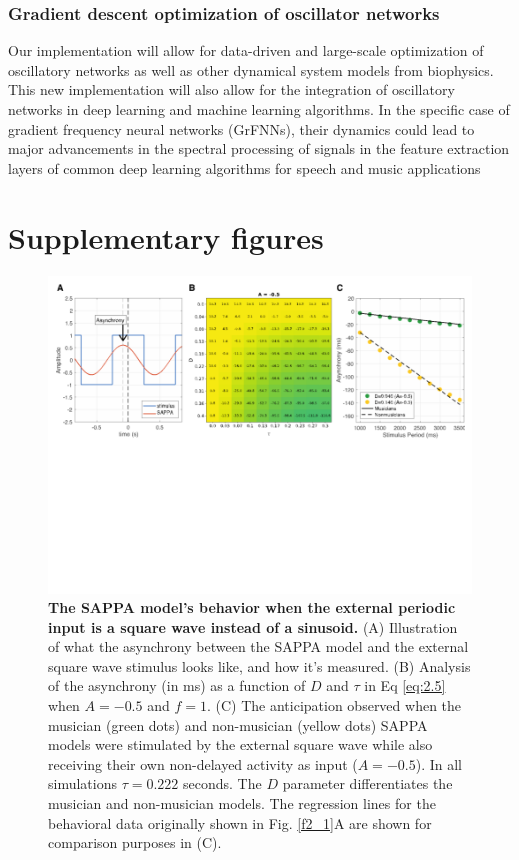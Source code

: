\documentclass{report}
\begin{document}
\subsection{Gradient descent optimization of oscillator networks}
Our implementation will allow for data-driven and large-scale optimization of oscillatory networks as well as other dynamical system models from biophysics. This new implementation will also allow for the integration of oscillatory networks in deep learning and machine learning algorithms. In the specific case of gradient frequency neural networks (GrFNNs), their dynamics could lead to major advancements in the spectral processing of signals in the feature extraction layers of common deep learning algorithms for speech and music applications


\appendix
\chapter{Supplementary figures}
\begin{figure}
    \centering
    \includegraphics[width=1.0\textwidth]{figures/figS_1.png}
    \caption[The SAPPA model's behavior when the external periodic input is a square wave instead of a sinusoid]{\textbf{The SAPPA model's behavior when the external periodic input is a square wave instead of a sinusoid.} (A) Illustration of what the asynchrony between the SAPPA model and the external square wave stimulus looks like, and how it's measured. (B) Analysis of the asynchrony (in ms) as a function of $D$ and $\tau$ in Eq \eqref{eq:2.5} when $A = -0.5$ and $f = 1$. (C) The anticipation observed when the musician (green dots) and non-musician (yellow dots) SAPPA models were stimulated by the external square wave while also receiving their own non-delayed activity as input ($A = -0.5$). In all simulations $\tau = 0.222$ seconds. The $D$ parameter differentiates the musician and non-musician models. The regression lines for the behavioral data originally shown in Fig.{} \ref{f2_1}A are shown for comparison purposes in (C).}
    \label{fS_1}
\end{figure}
\end{document}
